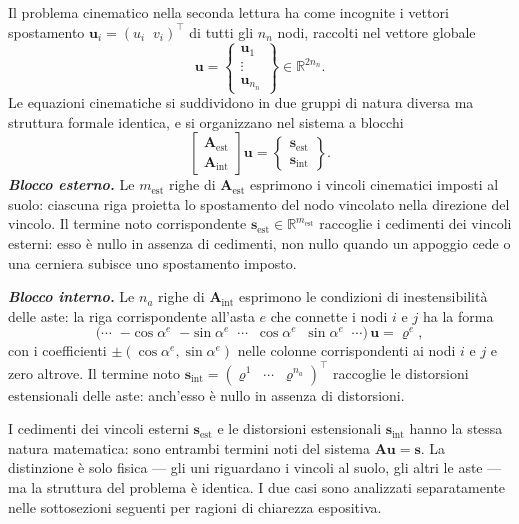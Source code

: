 Il problema cinematico nella seconda lettura ha come
incognite i vettori spostamento $\bm{u}_i = (u_i\;\;v_i)^\top$
di tutti gli $n_n$ nodi, raccolti nel vettore globale
\begin{equation}\label{eq:vettore_u_reticolare}
	\bm{u} = 
	\left\{
	\begin{array}{c} \bm{u}_1 \\ \vdots \\ \bm{u}_{n_n} 
	\end{array}
	\right\} \in \mathbb{R}^{2n_n}.
\end{equation}
Le equazioni cinematiche si suddividono in due gruppi
di natura diversa ma struttura formale identica,
e si organizzano nel sistema a blocchi
\begin{equation}\label{eq:Au=s}
	\begin{bmatrix} \bm{A}_\text{est} \\ \bm{A}_\text{int} 
	\end{bmatrix}\bm{u} =
	\left\{
	\begin{array}{c} \bm{s}_\text{est} \\ \bm{s}_\text{int} 
	\end{array}
	\right\}.
\end{equation}
\textbf{\textit{Blocco esterno.}}
Le $m_\text{est}$ righe di $\bm{A}_\text{est}$ esprimono
i vincoli cinematici imposti al suolo: ciascuna riga
proietta lo spostamento del nodo vincolato nella
direzione del vincolo. Il termine noto corrispondente
$\bm{s}_\text{est} \in \mathbb{R}^{m_\text{est}}$
raccoglie i cedimenti dei vincoli esterni: esso è
nullo in assenza di cedimenti, non nullo quando
un appoggio cede o una cerniera subisce uno
spostamento imposto.

\vspace{4pt}
\noindent \textit{\textbf{Blocco interno.}}
Le $n_a$ righe di $\bm{A}_\text{int}$ esprimono
le condizioni di inestensibilità delle aste:
la riga corrispondente all'asta $e$ che connette
i nodi $i$ e $j$ ha la forma
\[
\bigl(\cdots\;\;
{-\cos\alpha^e}\;\;{-\sin\alpha^e}
\;\;\cdots\;\;
{\cos\alpha^e}\;\;{\sin\alpha^e}
\;\;\cdots\bigr)\,\bm{u} = \varrho^e,
\]
con i coefficienti $\pm(\cos\alpha^e, \sin\alpha^e)$
nelle colonne corrispondenti ai nodi $i$ e $j$
e zero altrove. Il termine noto $\bm{s}_\text{int}
= (\varrho^1\;\;\cdots\;\;\varrho^{n_a})^\top$
raccoglie le distorsioni estensionali delle aste:
anch'esso è nullo in assenza di distorsioni.

\begin{oss}
	I cedimenti dei vincoli esterni $\bm{s}_\text{est}$
	e le distorsioni estensionali $\bm{s}_\text{int}$
	hanno la stessa natura matematica: sono entrambi
	termini noti del sistema $\bm{A}\bm{u} = \bm{s}$.
	La distinzione è solo fisica --- gli uni riguardano
	i vincoli al suolo, gli altri le aste --- ma la
	struttura del problema è identica. I due casi
	sono analizzati separatamente nelle sottosezioni
	seguenti per ragioni di chiarezza espositiva.
\end{oss}


